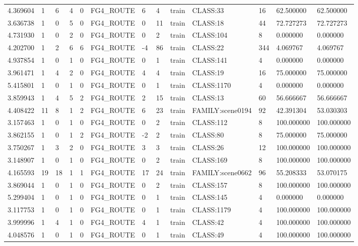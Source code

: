 \begin{tabular}{lllllllllllll}
4.369604 & 1 & 6 & 4 & 0 & FG4\_ROUTE & 6 & 4 & train & CLASS:33 & 16 & 62.500000 & 62.500000 \\
3.636738 & 1 & 0 & 5 & 0 & FG4\_ROUTE & 0 & 11 & train & CLASS:18 & 44 & 72.727273 & 72.727273 \\
4.731930 & 1 & 0 & 2 & 0 & FG4\_ROUTE & 0 & 2 & train & CLASS:104 & 8 & 0.000000 & 0.000000 \\
4.202700 & 1 & 2 & 6 & 6 & FG4\_ROUTE & -4 & 86 & train & CLASS:22 & 344 & 4.069767 & 4.069767 \\
4.937854 & 1 & 0 & 1 & 0 & FG4\_ROUTE & 0 & 1 & train & CLASS:141 & 4 & 0.000000 & 0.000000 \\
3.961471 & 1 & 4 & 2 & 0 & FG4\_ROUTE & 4 & 4 & train & CLASS:19 & 16 & 75.000000 & 75.000000 \\
5.415801 & 1 & 0 & 1 & 0 & FG4\_ROUTE & 0 & 1 & train & CLASS:1170 & 4 & 0.000000 & 0.000000 \\
3.859943 & 1 & 4 & 5 & 2 & FG4\_ROUTE & 2 & 15 & train & CLASS:13 & 60 & 56.666667 & 56.666667 \\
4.408422 & 11 & 8 & 1 & 2 & FG4\_ROUTE & 6 & 23 & train & FAMILY:scene0194 & 92 & 42.391304 & 53.030303 \\
3.157463 & 1 & 0 & 1 & 0 & FG4\_ROUTE & 0 & 2 & train & CLASS:112 & 8 & 100.000000 & 100.000000 \\
3.862155 & 1 & 0 & 1 & 2 & FG4\_ROUTE & -2 & 2 & train & CLASS:80 & 8 & 75.000000 & 75.000000 \\
3.750267 & 1 & 3 & 2 & 0 & FG4\_ROUTE & 3 & 3 & train & CLASS:26 & 12 & 100.000000 & 100.000000 \\
3.148907 & 1 & 0 & 1 & 0 & FG4\_ROUTE & 0 & 2 & train & CLASS:169 & 8 & 100.000000 & 100.000000 \\
4.165593 & 19 & 18 & 1 & 1 & FG4\_ROUTE & 17 & 24 & train & FAMILY:scene0662 & 96 & 55.208333 & 53.070175 \\
3.869044 & 1 & 0 & 1 & 0 & FG4\_ROUTE & 0 & 2 & train & CLASS:157 & 8 & 100.000000 & 100.000000 \\
5.299404 & 1 & 0 & 1 & 0 & FG4\_ROUTE & 0 & 1 & train & CLASS:145 & 4 & 0.000000 & 0.000000 \\
3.117753 & 1 & 0 & 1 & 0 & FG4\_ROUTE & 0 & 1 & train & CLASS:1179 & 4 & 100.000000 & 100.000000 \\
3.999996 & 1 & 4 & 1 & 0 & FG4\_ROUTE & 4 & 1 & train & CLASS:42 & 4 & 100.000000 & 100.000000 \\
4.048576 & 1 & 0 & 1 & 0 & FG4\_ROUTE & 0 & 1 & train & CLASS:49 & 4 & 100.000000 & 100.000000 \\

\end{tabular}
